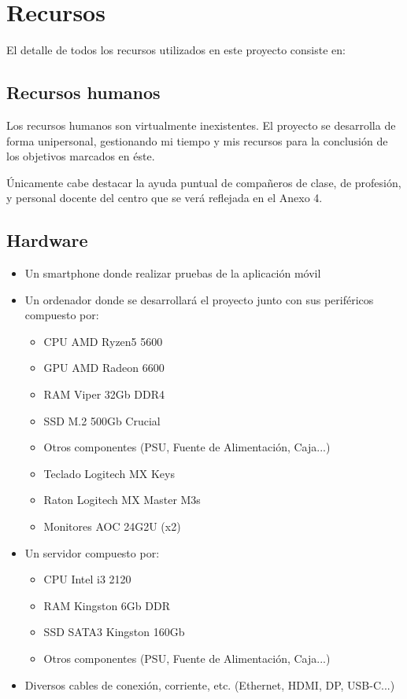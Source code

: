 \documentclass{article}
\begin{document}


\newpage
\section{Recursos}
\label{sec:Resources}

\noindent El detalle de todos los recursos utilizados en este proyecto consiste en:
\subsection{Recursos humanos}
\label{sec:HumanRes}

Los recursos humanos son virtualmente inexistentes. El proyecto se desarrolla de forma unipersonal, gestionando mi tiempo y mis recursos para la conclusión de los objetivos marcados en éste.

Únicamente cabe destacar la ayuda puntual de compañeros de clase, de profesión, y personal docente del centro que se verá reflejada en el Anexo 4.

\subsection{Hardware}
\begin{itemize}
	\item Un smartphone donde realizar pruebas de la aplicación móvil
	\item Un ordenador donde se desarrollará el proyecto junto con sus periféricos compuesto por:
	\begin{itemize}
    	\item CPU AMD Ryzen5 5600
    	\item GPU AMD Radeon 6600
    	\item RAM Viper 32Gb DDR4
    	\item SSD M.2 500Gb Crucial
    	\item Otros componentes (PSU, Fuente de Alimentación, Caja...)
    	\item Teclado Logitech MX Keys
    	\item Raton Logitech MX Master M3s
    	\item Monitores AOC 24G2U (x2)
	\end{itemize}
	\item Un servidor compuesto por:
	\begin{itemize}
    	\item CPU Intel i3 2120
    	\item RAM Kingston 6Gb DDR
    	\item SSD SATA3 Kingston 160Gb
    	\item Otros componentes (PSU, Fuente de Alimentación, Caja...)
	\end{itemize}
	\item Diversos cables de conexión, corriente, etc. (Ethernet, HDMI, DP, USB-C...)
\end{itemize}
\end{document}
